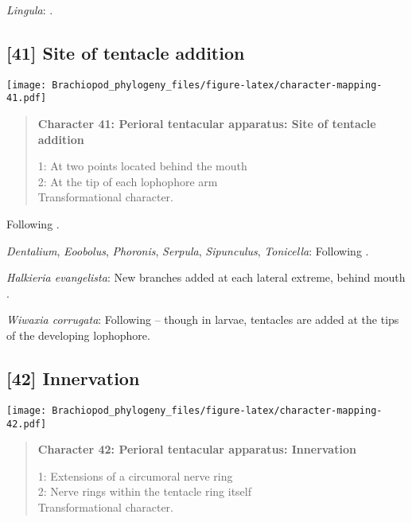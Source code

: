 \documentclass[openany]{book}
\theoremstyle{definition}
\theoremstyle{definition}
\theoremstyle{definition}
\theoremstyle{remark}
\begin{document}
\hypertarget{Lingula-coding-40}{}
\emph{Lingula}: \citet{Nielsen1966}.

\subsection*{{[}41{]} Site of tentacle
addition}\label{site-of-tentacle-addition}

\texttt{[image: Brachiopod\_phylogeny\_files/figure-latex/character-mapping-41.pdf]}

\begin{quote}
\textbf{Character 41: Perioral tentacular apparatus: Site of tentacle
addition}

1: At two points located behind the mouth\\
2: At the tip of each lophophore arm\\
Transformational character.
\end{quote}

Following \citet{Temereva2017Innervationof}.

\hypertarget{Dentalium-coding-41}{}
\emph{Dentalium}, \emph{Eoobolus}, \emph{Phoronis}, \emph{Serpula},
\emph{Sipunculus}, \emph{Tonicella}: Following
\citet{Temereva2017Innervationof}.

\hypertarget{Halkieria_evangelista-coding-41}{}
\emph{Halkieria evangelista}: New branches added at each lateral
extreme, behind mouth \citep{Adrianov2006}.

\hypertarget{Wiwaxia_corrugata-coding-41}{}
\emph{Wiwaxia corrugata}: Following \citet{Temereva2017Innervationof} --
though in larvae, tentacles are added at the tips of the developing
lophophore.

\subsection*{{[}42{]} Innervation}\label{innervation}

\texttt{[image: Brachiopod\_phylogeny\_files/figure-latex/character-mapping-42.pdf]}

\begin{quote}
\textbf{Character 42: Perioral tentacular apparatus: Innervation}

1: Extensions of a circumoral nerve ring\\
2: Nerve rings within the tentacle ring itself\\
Transformational character.
\end{quote}
\end{document}
